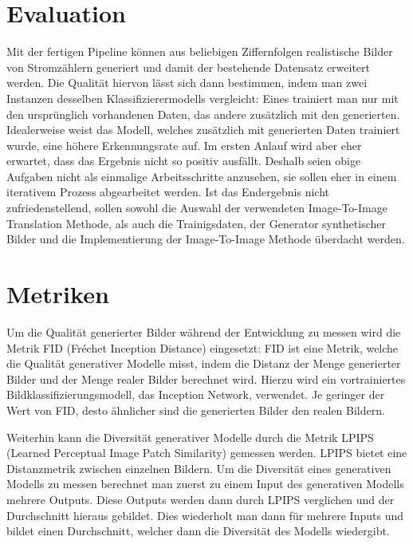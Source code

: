 \section*{Evaluation}
Mit der fertigen Pipeline können aus beliebigen Ziffernfolgen realistische Bilder von Stromzählern generiert und damit der bestehende Datensatz erweitert werden.
Die Qualität hiervon lässt sich dann bestimmen, indem man zwei Instanzen desselben Klassifizierermodells vergleicht: Eines trainiert man nur mit den ursprünglich
vorhandenen Daten, das andere zusätzlich mit den generierten.
Idealerweise weist das Modell, welches zusätzlich mit generierten Daten trainiert wurde, eine höhere Erkennungsrate auf.
Im ersten Anlauf wird aber eher erwartet, dass das Ergebnis nicht so positiv ausfällt. Deshalb seien obige Aufgaben nicht als einmalige Arbeitsschritte anzusehen, 
sie sollen eher in einem iterativem Prozess abgearbeitet werden. Ist das Endergebnis nicht zufriedenstellend, sollen sowohl die Auswahl der verwendeten
Image-To-Image Translation Methode, als auch die Trainigsdaten, der Generator synthetischer Bilder und die Implementierung der Image-To-Image Methode überdacht werden.

\section*{Metriken}
Um die Qualität generierter Bilder während der Entwicklung zu messen wird
die Metrik FID (Fréchet Inception Distance) \cite{fid} eingesetzt:
FID ist eine Metrik, welche die Qualität generativer Modelle misst, indem die
Distanz der Menge generierter Bilder und der Menge realer Bilder berechnet wird.
Hierzu wird ein vortrainiertes Bildklassifizierungsmodell, das Inception Network, verwendet.
Je geringer der Wert von FID, desto ähnlicher sind die generierten Bilder den realen Bildern.

Weiterhin kann die Diversität generativer Modelle durch die Metrik LPIPS (Learned Perceptual Image Patch Similarity) \cite{lpips}
gemessen werden. LPIPS bietet eine Distanzmetrik zwischen einzelnen Bildern.
Um die Diversität eines generativen Modells zu messen 
berechnet man zuerst zu einem Input des generativen Modells mehrere Outputs.
Diese Outputs werden dann durch LPIPS verglichen und der Durchschnitt hieraus gebildet.
Dies wiederholt man dann für mehrere Inputs und bildet einen Durchschnitt, welcher dann
die Diversität des Modells wiedergibt.